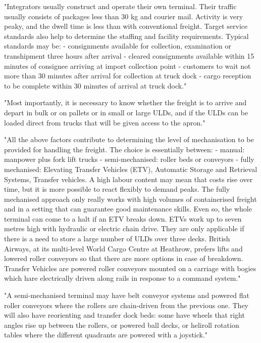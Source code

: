 "Integrators usually construct and operate their own terminal. Their traffic usually consists of packages less than 30 kg and courier mail. Activity is very peaky, and the dwell time is less than with conventional freight. Target service standards also help to determine the staffing and facility requirements. Typical standards may be:
 - consignments available for collection, examination or transhipment three hours after arrival
 - cleared consignments available within 15 minutes of consignee arriving at import collection point
 - customers to wait not more than 30 minutes after arrival for collection at truck dock
 - cargo reception to be complete within 30 minutes of arrival at truck dock."


"Most importantly, it is necessary to know whether the freight is to arrive and depart in bulk or on pallets or in small or large ULDs, and if the ULDs can be loaded direct from trucks that will be given access to the apron."


"All the above factors contribute to determining the level of mechanisation to be provided for
handling the freight. The choice is essentially between:
- manual: manpower plus fork lift trucks
- semi-mechanised: roller beds or conveyors
- fully mechanised: Elevating Transfer Vehicles (ETV), Automatic Storage and Retrieval Systems, Transfer vehicles.
A high labour content may mean that costs rise over time, but it is more possible to react flexibly to demand peaks. The fully mechanised approach only really works with high volumes of containerised freight and in a setting that can guarantee good maintenance skills. Even so, the whole terminal can come to a halt if an ETV breaks down. ETVs work up to seven metres high with hydraulic or electric chain drive. They are only applicable if there is a need to store a large number of ULDs over three decks. British Airways, at its multi-level World Cargo Centre at Heathrow, prefers lifts and lowered roller conveyors so that there are more options in case of breakdown. Transfer Vehicles are powered roller conveyors mounted on a carriage with bogies which hare electrically driven along rails in response to a command system."


"A semi-mechanised terminal may have belt conveyor systems and powered flat roller conveyors where the rollers are chain-driven from the previous one. They will also have reorienting and transfer dock beds: some have wheels that right angles rise up between the rollers, or powered ball decks, or heliroll rotation tables where the different quadrants are powered with a joystick."


